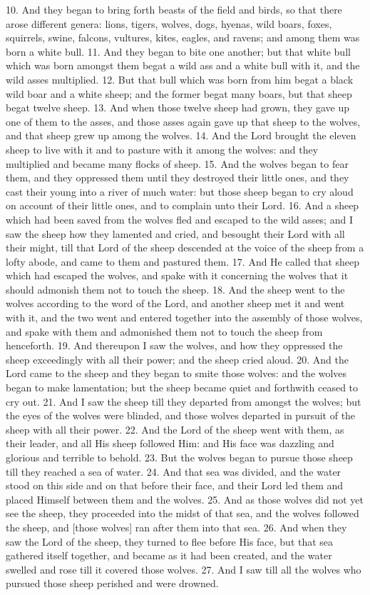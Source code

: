 10. And they began to bring forth beasts of the
field and birds, so that there arose different genera:
lions, tigers, wolves, dogs, hyenas, wild boars, foxes,
squirrels, swine, falcons, vultures, kites, eagles, and
ravens; and among them was born a white bull.
11. And they began to bite one another; but that
white bull which was born amongst them begat a
wild ass and a white bull with it, and the wild asses
multiplied. 12. But that bull which was born from him
begat a black wild boar and a white sheep; and the
former begat many boars, but that sheep begat twelve
sheep. 13. And when those twelve sheep had grown,
they gave up one of them to the asses, and those
asses again gave up that sheep to the wolves, and that
sheep grew up among the wolves. 14. And the Lord
brought the eleven sheep to live with it and to pasture
with it among the wolves: and they multiplied and
became many flocks of sheep. 15. And the wolves
began to fear them, and they oppressed them until
they destroyed their little ones, and they cast their
young into a river of much water: but those sheep
began to cry aloud on account of their little ones, and
to complain unto their Lord. 16. And a sheep which
had been saved from the wolves fled and escaped to
the wild asses; and I saw the sheep how they lamented
and cried, and besought their Lord with all their
might, till that Lord of the sheep descended at the
voice of the sheep from a lofty abode, and came to
them and pastured them. 17. And He called that
sheep which had escaped the wolves, and spake with
it concerning the wolves that it should admonish
them not to touch the sheep. 18. And the sheep went
to the wolves according to the word of the Lord, and
another sheep met it and went with it, and the two
went and entered together into the assembly of those
wolves, and spake with them and admonished them
not to touch the sheep from henceforth. 19. And
thereupon I saw the wolves, and how they oppressed
the sheep exceedingly with all their power; and the
sheep cried aloud. 20. And the Lord came to the
sheep and they began to smite those wolves: and the
wolves began to make lamentation; but the sheep
became quiet and forthwith ceased to cry out.
21. And I saw the sheep till they departed from
amongst the wolves; but the eyes of the wolves were
blinded, and those wolves departed in pursuit of the
sheep with all their power. 22. And the Lord of the
sheep went with them, as their leader, and all His
sheep followed Him: and His face was dazzling and
glorious and terrible to behold. 23. But the wolves
began to pursue those sheep till they reached a sea of
water. 24. And that sea was divided, and the water
stood on this side and on that before their face, and
their Lord led them and placed Himself between them
and the wolves. 25. And as those wolves did not
yet see the sheep, they proceeded into the midst of
that sea, and the wolves followed the sheep, and
[those wolves] ran after them into that sea. 26. And
when they saw the Lord of the sheep, they turned
to flee before His face, but that sea gathered itself
together, and became as it had been created, and
the water swelled and rose till it covered those wolves.
27. And I saw till all the wolves who pursued those
sheep perished and were drowned.

